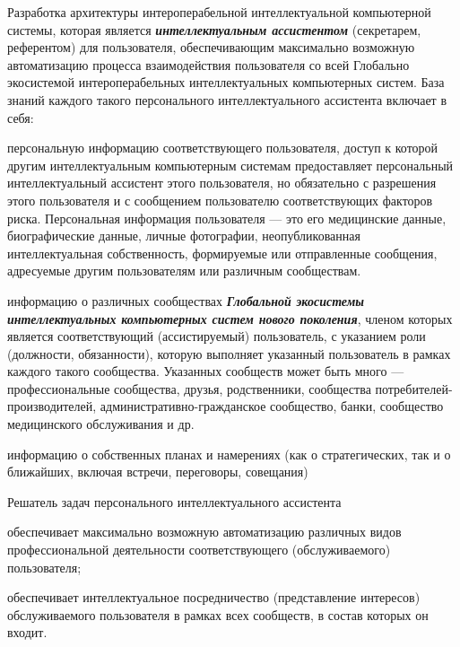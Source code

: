 \begin{textitemize}
	\item Разработка архитектуры интероперабельной интеллектуальной компьютерной системы, которая является \textbf{\textit{ интеллектуальным ассистентом}} (секретарем, референтом) для  пользователя, обеспечивающим максимально возможную автоматизацию процесса взаимодействия пользователя со всей Глобально экосистемой интероперабельных интеллектуальных компьютерных систем. База знаний каждого такого персонального интеллектуального ассистента включает в себя:
	\begin{textitemize}
		\item персональную информацию соответствующего пользователя, доступ к которой другим интеллектуальным компьютерным системам предоставляет персональный интеллектуальный ассистент этого пользователя, но обязательно с разрешения этого пользователя и с сообщением пользователю соответствующих факторов риска. Персональная информация пользователя --- это его медицинские данные, биографические данные, личные фотографии, неопубликованная интеллектуальная собственность, формируемые или отправленные сообщения, адресуемые другим пользователям или различным сообществам.
		\item информацию о различных сообществах \textbf{\textit{Глобальной экосистемы интеллектуальных компьютерных систем нового поколения}}, членом которых является соответствующий (ассистируемый) пользователь, с указанием роли (должности, обязанности), которую выполняет указанный пользователь в рамках каждого такого сообщества. Указанных сообществ может быть много --- профессиональные сообщества, друзья, родственники, сообщества потребителей-производителей, административно-гражданское сообщество, банки, сообщество медицинского обслуживания и др.
		\item информацию о собственных планах и намерениях (как о стратегических, так и о ближайших, включая встречи, переговоры, совещания)
	\end{textitemize}
	Решатель задач персонального интеллектуального ассистента
	\begin{textitemize}
		\item обеспечивает максимально возможную автоматизацию различных видов профессиональной   деятельности соответствующего (обслуживаемого) пользователя; 
		\item обеспечивает интеллектуальное посредничество (представление интересов) обслуживаемого пользователя в рамках всех сообществ, в состав которых он входит.
	\end{textitemize}

\end{textitemize}
